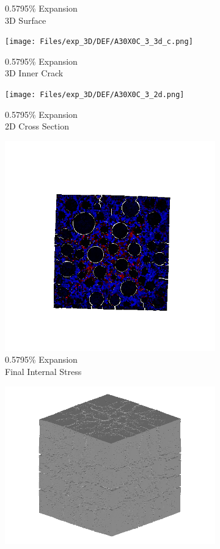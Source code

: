 \begin{figure}[ht!]
\begin{subfigure}{.25\textwidth}
      \caption{0.5795\% Expansion\\3D Surface}
    \end{subfigure}%
    \begin{subfigure}{.25\textwidth}
      \centering
      \texttt{[image: Files/exp\_3D/DEF/A30X0C\_3\_3d\_c.png]}
      \caption{0.5795\% Expansion\\3D Inner Crack}
    \end{subfigure}%
    \begin{subfigure}{.25\textwidth}
      \centering
      \texttt{[image: Files/exp\_3D/DEF/A30X0C\_3\_2d.png]}
      \caption{0.5795\% Expansion\\2D Cross Section}
    \end{subfigure}%
    \begin{subfigure}{.25\textwidth}
      \centering
      \includegraphics[width=.8\linewidth]{Files/exp_3D/DEF/A30X0C_3_stress.png}
      \caption{0.5795\% Expansion\\Final Internal Stress}
    \end{subfigure}
    \begin{subfigure}{.25\textwidth}
      \centering
      \includegraphics[width=.8\linewidth]{Files/exp_3D/DEF/A30X0C_4_3d.png}

\end{subfigure}
\end{figure}
